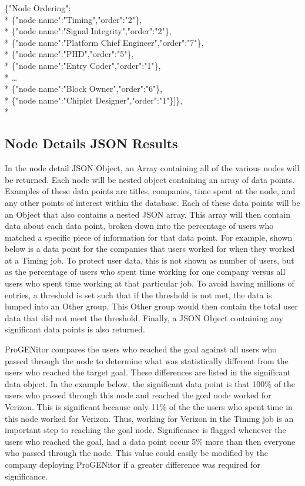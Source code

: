 \noindent \{"Node Ordering":\\*
	\indent\{"node	name":"Timing","order":"2"\},\\*
	\indent\{"node name":"Signal Integrity","order":"2"\},\\*
	\indent\{"node name":"Platform Chief Engineer","order":"7"\},\\*
	\indent\{"node name":"PHD","order":"5"\},\\*
	\indent\{"node name":"Entry Coder","order":"1"\},\\*
	\indent\ldots\\*
	\indent\{"node name":"Block Owner","order":"6"\},\\*
	\indent\{"node name":"Chiplet Designer","order":"1"\}]\},\\*


\subsection{Node Details JSON Results}
In the node detail JSON Object, an Array containing all of the various nodes
will be returned.  Each node will be nested object containing an array of data
points.  Examples of these data points are titles, companies, time spent at the
node, and any other points of interest within the database.  Each of these data
points will be an Object that also contains a nested JSON array.  This array
will then contain data about each data point, broken down into the percentage of
users who matched a specific piece of information for that data point.  For
example, shown below is a data point for the companies that users worked for
when they worked at a Timing job.  To protect user data, this is not shown as
number of users, but as the percentage of users who spent time working for one
company versus all users who spent time working at that particular job.  To
avoid having millions of entries, a threshold is set such that if the threshold
is not met, the data is lumped into an Other group.  This Other group would then
contain the total user data that did not meet the threshold.  Finally, a JSON
Object containing any significant data points is also returned.  

ProGENitor compares the users who reached the goal against all users who passed
through the node to determine what was statistically different from the users
who reached the target goal.  These differences are listed in the significant
data object. In the example below, the significant data point is that 100\% of
the users who passed through this node and reached the goal node worked for
Verizon.  This is significant because only 11\% of the the users who spent time
in this node worked for Verizon.  Thus, working for Verizon in the Timing job is
an important step to reaching the goal node.  Significance is flagged whenever
the users who reached the goal, had a data point occur 5\% more than then
everyone who passed through the node.  This value could easily be modified by
the company deploying ProGENitor if a greater difference was required for significance.

